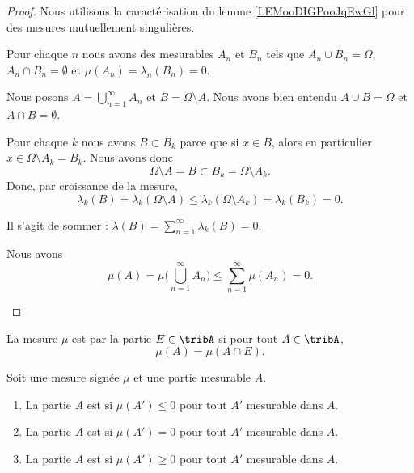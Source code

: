 \begin{proof}
	Nous utilisons la caractérisation du lemme \ref{LEMooDIGPooJqEwGl} pour des mesures mutuellement singulières.

	Pour chaque \( n\) nous avons des mesurables \( A_n\) et \( B_n\) tels que \( A_n\cup B_n=\Omega\), \( A_n\cap B_n=\emptyset\) et \( \mu(A_n)=\lambda_n(B_n)=0\).

	Nous posons \( A=\bigcup_{n=1}^{\infty}A_n\) et \( B=\Omega\setminus A\). Nous avons bien entendu \( A\cup B=\Omega\) et \( A\cap B=\emptyset\).
	\begin{subproof}
		\spitem[\( \lambda_k(B)=0\) pour tout \( k\)]
		Pour chaque \( k\) nous avons \( B\subset B_k\) parce que si \( x\in B\), alors en particulier \( x\in \Omega\setminus A_k=B_k\). Nous avons donc
		\begin{equation}
			\Omega\setminus A=B\subset B_k=\Omega\setminus A_k.
		\end{equation}
		Donc, par croissance de la mesure,
		\begin{equation}
			\lambda_k(B)=\lambda_k(\Omega\setminus A)\leq \lambda_k(\Omega\setminus A_k)=\lambda_k(B_k)=0.
		\end{equation}

		\spitem[\( \lambda(B)=0\)]
		Il s'agit de sommer : \( \lambda(B)=\sum_{n=1}^{\infty}\lambda_k(B)=0\).

		\spitem[\( \mu(A)=0\)]
		Nous avons
		\begin{equation}
			\mu(A)=\mu\Big( \bigcup_{n=1}^{\infty}A_n \Big)\leq \sum_{n=1}^{\infty}\mu(A_n)=0.
		\end{equation}
	\end{subproof}
\end{proof}

\begin{definition}
	La mesure \( \mu\) est  par la partie \( E\in\tribA\) si pour tout \( A\in\tribA\),
	\begin{equation}
		\mu(A)=\mu(A\cap E).
	\end{equation}
\end{definition}

\begin{definition}
	Soit une mesure signée \( \mu\) et une partie mesurable \( A\).
	\begin{enumerate}
		\item
		      La partie \( A\) est  si \( \mu(A')\leq 0\) pour tout \( A'\) mesurable dans \( A\).
		\item
		      La partie \( A\) est  si \( \mu(A')= 0\) pour tout \( A'\) mesurable dans \( A\).
		\item
		      La partie \( A\) est  si \( \mu(A')\geq0\) pour tout \( A'\) mesurable dans \( A\).
	\end{enumerate}
\end{definition}


